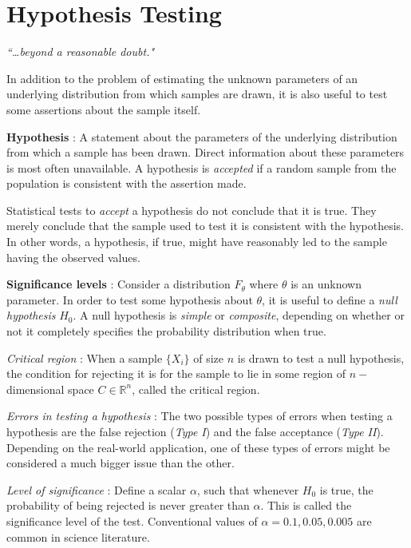 \chapter{Hypothesis Testing}


\begin{flushright}
	\textit{``\dots beyond a reasonable doubt."} 
\end{flushright}

In addition to the problem of estimating the unknown parameters of an underlying distribution from which samples are drawn, it is also useful to test some assertions about the sample itself.

\textbf{Hypothesis} : A statement about the parameters of the underlying distribution from which a sample has been drawn. Direct information about these parameters is most often unavailable. A hypothesis is \textit{accepted} if a random sample from the population is consistent with the assertion made.

Statistical tests to \textit{accept} a hypothesis do not conclude that it is true. They merely conclude that the sample used to test it is consistent with the hypothesis. In other words, a hypothesis, if true, might have reasonably led to the sample having the observed values.


\textbf{Significance levels} : Consider a distribution $ F_\theta $ where $ \theta $ is an unknown parameter. In order to test some hypothesis about $ \theta $, it is useful to define a \textit{null hypothesis} $ H_0 $. A null hypothesis is \textit{simple} or \textit{composite}, depending on whether or not it completely specifies the probability distribution when true.

\textit{Critical region} : When a sample $ \{X_i\} $ of size $ n $ is drawn to test a null hypothesis, the condition for rejecting it is for the sample to lie in some region of $ n -$dimensional space $ C \in \mathbb{R}^n $, called the critical region.

\textit{Errors in testing a hypothesis} : The two possible types of errors when testing a hypothesis are the false rejection (\textit{Type I}) and the false acceptance (\textit{Type II}). Depending on the real-world application, one of these types of errors might be considered a much bigger issue than the other.

\textit{Level of significance} : Define a scalar $ \alpha $, such that whenever $ H_0 $ is true, the probability of being rejected is never greater than $ \alpha $. This is called the significance level of the test. Conventional values of $ \alpha = 0.1, 0.05, 0.005 $ are common in science literature.

